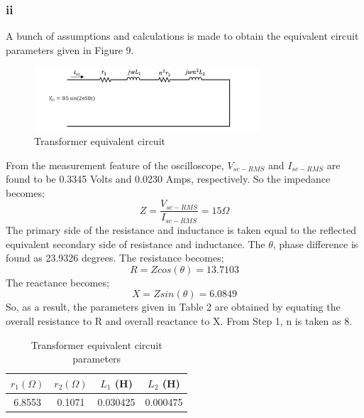 \documentclass[letterpaper,12pt]{article}
\begin{document}
\subsubsection{ii}
A bunch of assumptions and calculations is made to obtain the equivalent circuit parameters given in Figure 9.
\begin{figure}[H]
    \centering
    \includegraphics[width = 0.75\textwidth]{3.png}
    \caption{Transformer equivalent circuit}
\end{figure} 
From the measurement feature of the oscilloscope, \(V_{sc-RMS}\) and \(I_{sc-RMS}\) are found to be 0.3345 Volts and 0.0230 Amps, respectively. So the impedance becomes;
\[
    Z = \frac{V_{sc-RMS}}{I_{sc-RMS}} = 15 \Omega
    \]
    The primary side of the resistance and inductance is taken equal to the reflected equivalent secondary side of resistance and inductance. The \(\theta\), phase difference is found as 23.9326 degrees. The resistance becomes;
    \[
    R = Z cos (\theta) = 13.7103
    \]
    The reactance becomes;
    \[
    X = Z sin (\theta) = 6.0849 
    \]
    So, as a result, the parameters given in Table 2 are obtained by equating the overall resistance to R and overall reactance to X. From Step 1, n is taken as 8.
    \begin{table}[H]
    \begin{center}
        \caption{Transformer equivalent circuit parameters}
        \vspace{2mm}
        \begin{tabular}{||c | c | c | c ||} 
            \hline
            \(r_1 (\Omega) \) & \(r_2 (\Omega)\)  & \(L_1\) (H) & \(L_2\) (H) \\ [0.5ex] 
            \hline\hline
            6.8553 & 0.1071 & 0.030425 & 0.000475 \\ 
            \hline
        \end{tabular}
    \end{center}
    \end{table}
    

\end{document}
